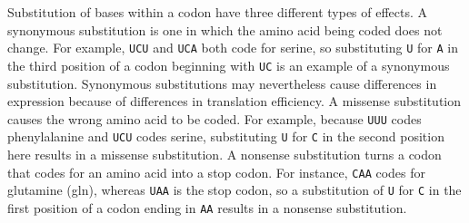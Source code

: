 \documentclass[11pt]{report}
\newcommand{\mybase}[1]{\texttt{#1}\xspace}
\newcommand{\baseA}{\mybase{A}}
\newcommand{\baseC}{\mybase{C}}
\newcommand{\baseU}{\mybase{U}}
\begin{document}
Substitution of bases within a codon have three different types of
effects. A synonymous substitution is one in which the amino acid
being coded does not change. For example, \baseU{}\baseC{}\baseU and
\baseU{}\baseC{}\baseA both code for serine, so substituting \baseU
for \baseA in the third position of a codon beginning with
\baseU{}\baseC is an example of a synonymous substitution. Synonymous
substitutions may nevertheless cause differences in expression because
of differences in translation efficiency. A missense substitution
causes the wrong amino acid to be coded. For example, because
\baseU\baseU\baseU codes phenylalanine and \baseU{}\baseC{}\baseU
codes serine, substituting \baseU for \baseC in the second position
here results in a missense substitution. A nonsense substitution turns
a codon that codes for an amino acid into a stop codon. For instance,
\baseC{}\baseA{}\baseA codes for glutamine (gln), whereas
\baseU{}\baseA{}\baseA is the stop codon, so a substitution of \baseU
for \baseC in the first position of a codon ending in \baseA{}\baseA
results in a nonsense substitution.
\end{document}
